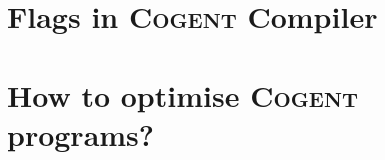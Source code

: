 \documentclass[a4paper]{article}
\newcommand{\cogent}{\textsc{Cogent}\xspace}
\begin{document}
\section{Flags in \cogent Compiler}

\section{How to optimise \cogent programs?}

%
\end{document}
